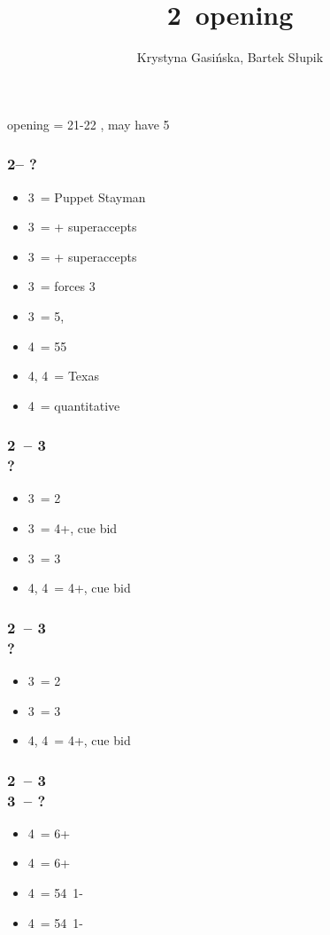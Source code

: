 \documentclass[12pt, a4paper]{article}
\title{2\ntx\ opening}
\author{Krystyna Gasińska, Bartek Słupik}
\begin{document}
\maketitle


\alrts{2\nt} opening = 21-22 \bal, may have 5\major

\subsubsection*{2\nt -- ?}
\begin{itemize}
    \item 3\clubs\ = Puppet Stayman
    \item 3\diams\ = \then \hearts + superaccepts
    \item 3\hearts\ = \then \spades + superaccepts
    \item 3\spades\ = forces 3\nt
    \item 3\nt\ = 5\hearts, \nf \imp
    \item 4\clubs\ = 55 \major
    \item 4\diams, 4\hearts\ = Texas
    \item 4\nt\ = quantitative
\end{itemize}

\subsubsection*{2\ntx\ -- 3\diams \\ ?}
\begin{itemize}
    \item 3\hearts\ = 2\hearts
    \item 3\spades\ = 4+\hearts, cue bid
    \item 3\nt\ = 3\spades
    \item 4\clubs, 4\diams\ = 4+\hearts, cue bid
\end{itemize}

\subsubsection*{2\ntx\ -- 3\hearts \\ ?}
\begin{itemize}
    \item 3\spades\ = 2\spades
    \item 3\nt\ = 3\spades
    \item 4\clubs, 4\diams\ = 4+\spades, cue bid
\end{itemize}

\subsubsection*{2\ntx\ -- 3\spades \\ 3\nt\ -- ?}
\begin{itemize}
    \item 4\clubs\ = 6+\clubs
    \item 4\diams\ = 6+\diams
    \item 4\hearts\ = 54\minor\ 1-\hearts
    \item 4\spades\ = 54\minor\ 1-\spades
\end{itemize}

\end{document}
